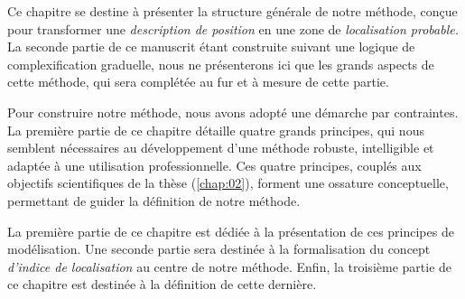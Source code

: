 Ce chapitre se destine à présenter la structure générale de notre
méthode, conçue pour transformer une \emph{description de position} en
une zone de \emph{localisation probable.} La seconde partie de ce
manuscrit étant construite suivant une logique de complexification
graduelle, nous ne présenterons ici que les grands aspects de cette
méthode, qui sera complétée au fur et à mesure de cette partie.

Pour construire notre méthode, nous avons adopté une démarche par
contraintes. La première partie de ce chapitre détaille quatre grands
principes, qui nous semblent nécessaires au développement d'une
méthode robuste, intelligible et adaptée à une utilisation
professionnelle. Ces quatre principes, couplés aux objectifs
scientifiques de la thèse (\autoref{chap:02}), forment une ossature
conceptuelle, permettant de guider la définition de notre méthode.

La première partie de ce chapitre est dédiée à la présentation de ces
principes de modélisation. Une seconde partie sera destinée à la
formalisation du concept \emph{d'indice de localisation} au centre de
notre méthode. Enfin, la troisième partie de ce chapitre est destinée
à la définition de cette dernière.
